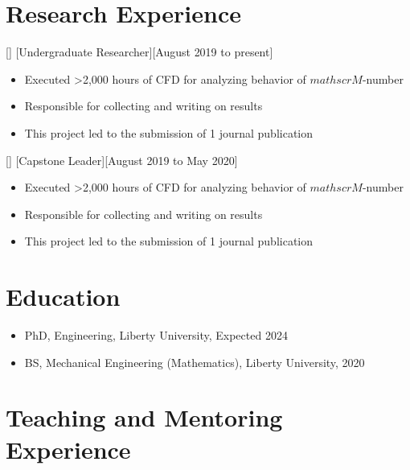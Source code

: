 \documentclass{article}
\begin{document}
 
\section{Research Experience}
	[Undergraduate Researcher][August 2019 to present]
	
	
		\begin{itemize}
			\item Executed >2,000 hours of CFD for analyzing behavior of $mathscr{M}$-number
			\item Responsible for collecting and writing on results
			\item This project led to the submission of 1 journal publication
		\end{itemize}
	
	[Capstone Leader][August 2019 to May 2020]
	
	
		\begin{itemize}
			\item Executed >2,000 hours of CFD for analyzing behavior of $mathscr{M}$-number
			\item Responsible for collecting and writing on results
			\item This project led to the submission of 1 journal publication
		\end{itemize}

 
\section{Education}
	
	\begin{itemize}
		\item PhD, Engineering, Liberty University, Expected 2024  
		\item BS, Mechanical Engineering (Mathematics), Liberty University, 2020
	\end{itemize}

 
\section{Teaching and Mentoring Experience }
\end{document}
